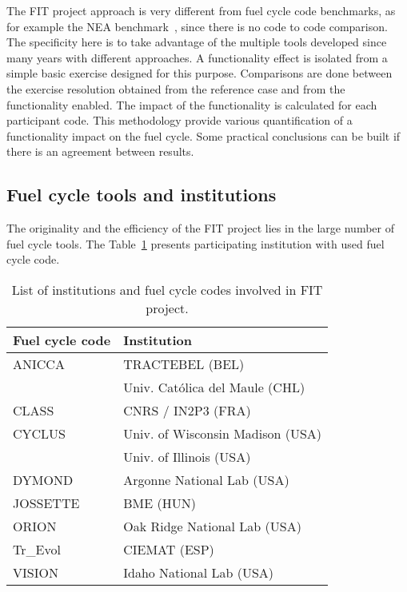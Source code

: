 The FIT project approach is very different from fuel cycle code benchmarks, as
for example the NEA benchmark~\cite{NEA2016}, since there is no code to code
comparison. The specificity here is to take advantage of the multiple tools
developed since many years with different approaches. A functionality effect is
isolated from a simple basic exercise designed for this purpose. Comparisons are
done between the exercise resolution obtained from the reference case and from
the functionality enabled. The impact of the functionality is calculated for
each participant code. This methodology provide various quantification of a
functionality impact on the fuel cycle. Some practical conclusions can be built
if there is an agreement between results.

\subsection{Fuel cycle tools and institutions}

The originality and the efficiency of the FIT project lies in the large number
of fuel cycle tools. The Table~\ref{Tab:Code} presents participating institution
with used fuel cycle code.

\begin{table}[h]
\centering
\begin{tabular}{ |l|l| }
  \hline
  Fuel cycle code & Institution \\
  \hline
  ANICCA\cite{} & TRACTEBEL (BEL) \\
   & Univ. Católica del Maule (CHL) \\
  \hline
  CLASS\cite{} & CNRS / IN2P3 (FRA) \\
  \hline
  CYCLUS\cite{} & Univ. of Wisconsin Madison (USA) \\
  & Univ. of Illinois (USA) \\
  \hline
  DYMOND\cite{} & Argonne National Lab (USA) \\
  \hline
  JOSSETTE\cite{} & BME (HUN) \\
  \hline
  ORION\cite{} & Oak Ridge National Lab (USA) \\
  \hline
  Tr\_Evol\cite{} & CIEMAT (ESP) \\
  \hline
  VISION\cite{} & Idaho National Lab (USA) \\
  \hline
\end{tabular}
\label{Tab:Code}
\caption{List of institutions and fuel cycle codes involved in FIT project.}
\end{table}

